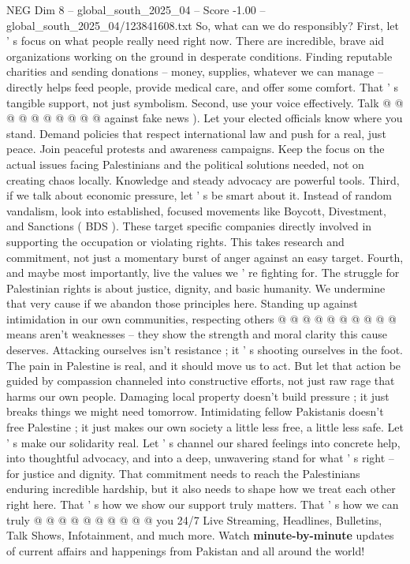 \begin{textsample}{NEG Dim 8 – global\_south\_2025\_04 – Score -1.00 – global\_south\_2025\_04/123841608.txt}
So, what can we do responsibly?
First, let ' s focus on what people really need right now.
There are incredible, brave aid organizations working on the ground in desperate conditions.
Finding reputable charities and sending donations -- money, supplies, whatever we can manage -- directly helps feed people, provide medical care, and offer some comfort.
That ' s tangible support, not just symbolism.
Second, use your voice effectively.
Talk @ @ @ @ @ @ @ @ @ @ against fake news ).
Let your elected officials know where you stand.
Demand policies that respect international law and push for a real, just peace.
Join peaceful protests and awareness campaigns.
Keep the focus on the actual issues facing Palestinians and the political solutions needed, not on creating chaos locally.
Knowledge and steady advocacy are powerful tools.
Third, if we talk about economic pressure, let ' s be smart about it.
Instead of random vandalism, look into established, focused movements like Boycott, Divestment, and Sanctions ( BDS ).
These target specific companies directly involved in supporting the occupation or violating rights.
This takes research and commitment, not just a momentary burst of anger against an easy target.
Fourth, and maybe most importantly, live the values we ' re fighting for.
The struggle for Palestinian rights is about justice, dignity, and basic humanity.
We undermine that very cause if we abandon those principles here.
Standing up against intimidation in our own communities, respecting others @ @ @ @ @ @ @ @ @ @ means aren't weaknesses -- they show the strength and moral clarity this cause deserves.
Attacking ourselves isn't resistance ; it ' s shooting ourselves in the foot.
The pain in Palestine is real, and it should move us to act.
But let that action be guided by compassion channeled into constructive efforts, not just raw rage that harms our own people.
Damaging local property doesn't build pressure ; it just breaks things we might need tomorrow.
Intimidating fellow Pakistanis doesn't free Palestine ; it just makes our own society a little less free, a little less safe.
Let ' s make our solidarity real.
Let ' s channel our shared feelings into concrete help, into thoughtful advocacy, and into a deep, unwavering stand for what ' s right -- for justice and dignity.
That commitment needs to reach the Palestinians enduring incredible hardship, but it also needs to shape how we treat each other right here.
That ' s how we show our support truly matters.
That ' s how we can truly @ @ @ @ @ @ @ @ @ @ you 24/7 Live Streaming, Headlines, Bulletins, Talk Shows, Infotainment, and much more.
Watch \textbf{minute-by-minute} updates of current affairs and happenings from Pakistan and all around the world!

\end{textsample}
